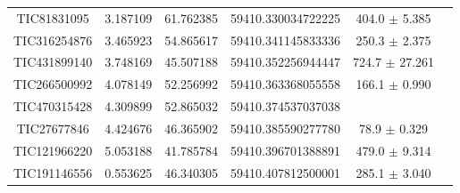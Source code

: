 \documentclass{aastex63}
\begin{document}
\begin{table}[h!]
\begin{tabular*}{\textwidth}{c @{\extracolsep{\fill}} ccccc}
        TIC81831095 & 3.187109 & 61.762385 & 59410.330034722225 & 404.0 \(\pm\) 5.385 \\
        TIC316254876 & 3.465923 & 54.865617 & 59410.341145833336 & 250.3 \(\pm\) 2.375 \\
        TIC431899140 & 3.748169 & 45.507188 & 59410.352256944447 & 724.7 \(\pm\) 27.261 \\
        TIC266500992 & 4.078149 & 52.256992 & 59410.363368055558 & 166.1 \(\pm\) 0.990 \\
        TIC470315428 & 4.309899 & 52.865032 & 59410.374537037038 & \\
        TIC27677846 & 4.424676 & 46.365902 & 59410.385590277780 & 78.9 \(\pm\) 0.329 \\
        TIC121966220 & 5.053188 & 41.785784 & 59410.396701388891 & 479.0 \(\pm\) 9.314 \\
        TIC191146556 & 0.553625 & 46.340305 & 59410.407812500001 & 285.1 \(\pm\) 3.040\\
         \hline
    \end{tabular*}
    \label{tb: TESS_observed_targets}
\end{table}
\end{document}
